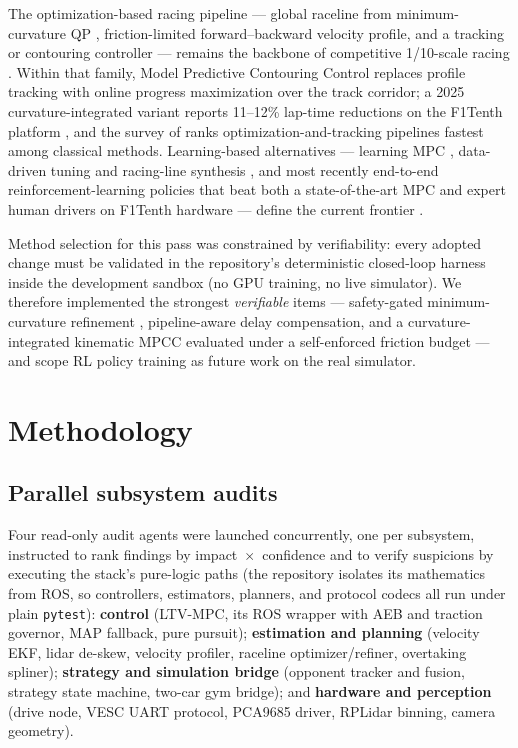 \documentclass[11pt]{article}
\begin{document}
The optimization-based racing pipeline --- global raceline from
minimum-curvature QP \cite{heilmeier,tumftm}, friction-limited
forward--backward velocity profile, and a tracking or contouring
controller --- remains the backbone of competitive 1/10-scale racing
\cite{forzaeth,survey}.  Within that family, Model Predictive Contouring
Control \cite{liniger} replaces profile tracking with online progress
maximization over the track corridor; a 2025 curvature-integrated
variant reports 11--12\% lap-time reductions on the F1Tenth platform
\cite{cimpcc}, and the survey of \cite{survey} ranks
optimization-and-tracking pipelines fastest among classical methods.
Learning-based alternatives --- learning MPC \cite{lmpc}, data-driven
tuning and racing-line synthesis \cite{bayesrace}, and most recently
end-to-end reinforcement-learning policies that beat both a
state-of-the-art MPC and expert human drivers on F1Tenth hardware
\cite{rlracing} --- define the current frontier \cite{roboracer}.

Method selection for this pass was constrained by verifiability: every
adopted change must be validated in the repository's deterministic
closed-loop harness inside the development sandbox (no GPU training, no
live simulator).  We therefore implemented the strongest
\emph{verifiable} items --- safety-gated minimum-curvature refinement
\cite{heilmeier}, pipeline-aware delay compensation, and a
curvature-integrated kinematic MPCC \cite{liniger,cimpcc} evaluated
under a self-enforced friction budget --- and scope RL policy training
\cite{rlracing} as future work on the real simulator.

\section{Methodology}
\label{sec:method}

\subsection{Parallel subsystem audits}

Four read-only audit agents were launched concurrently, one per
subsystem, instructed to rank findings by impact~$\times$~confidence and
to verify suspicions by executing the stack's pure-logic paths (the
repository isolates its mathematics from ROS, so controllers,
estimators, planners, and protocol codecs all run under plain
\texttt{pytest}): \textbf{control} (LTV-MPC, its ROS wrapper with AEB
and traction governor, MAP fallback, pure pursuit);
\textbf{estimation and planning} (velocity EKF, lidar de-skew, velocity
profiler, raceline optimizer/refiner, overtaking spliner);
\textbf{strategy and simulation bridge} (opponent tracker and fusion,
strategy state machine, two-car gym bridge); and \textbf{hardware and
perception} (drive node, VESC UART protocol, PCA9685 driver, RPLidar
binning, camera geometry).
\end{document}
